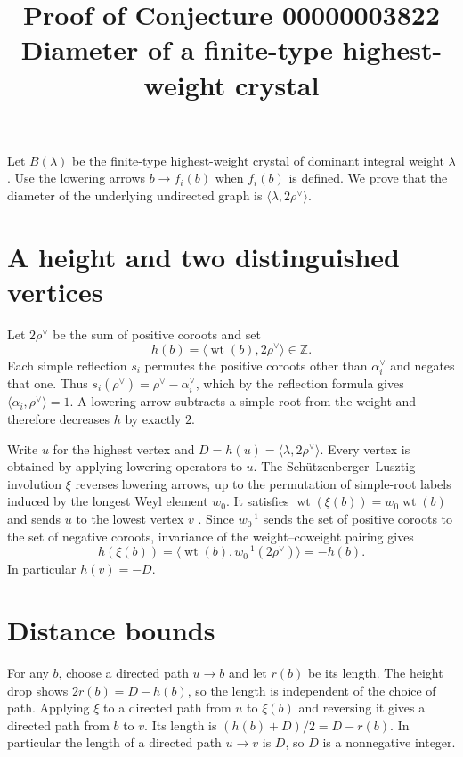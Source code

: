 \documentclass[11pt]{article}
\title{Proof of Conjecture 00000003822\\
\large Diameter of a finite-type highest-weight crystal}
\author{}
\date{}
\begin{document}
\maketitle

Let \(B(\lambda)\) be the finite-type highest-weight crystal of dominant
integral weight \(\lambda\). Use the lowering arrows
\(b\to f_i(b)\) when \(f_i(b)\) is defined. We prove that the diameter
of the underlying undirected graph is \(\langle\lambda,2\rho^\vee\rangle\).

\section*{A height and two distinguished vertices}

Let \(2\rho^\vee\) be the sum of positive coroots and set
\[
   h(b)=\langle\operatorname{wt}(b),2\rho^\vee\rangle\in\mathbb Z .
\]
Each simple reflection \(s_i\) permutes the positive coroots other
than \(\alpha_i^\vee\) and negates that one. Thus
\(s_i(\rho^\vee)=\rho^\vee-\alpha_i^\vee\), which by the reflection
formula gives \(\langle\alpha_i,\rho^\vee\rangle=1\). A lowering arrow
subtracts a simple root from the weight and therefore decreases \(h\)
by exactly \(2\).

Write \(u\) for the highest vertex and \(D=h(u)=
\langle\lambda,2\rho^\vee\rangle\). Every vertex is obtained by
applying lowering operators to \(u\). The Sch\"utzenberger--Lusztig
involution \(\xi\) reverses lowering arrows, up to the permutation
of simple-root labels induced by the longest Weyl element \(w_0\).
It satisfies \(\operatorname{wt}(\xi(b))=w_0\operatorname{wt}(b)\)
and sends \(u\) to the lowest vertex \(v\)
\cite[\S\S 3, 6.1]{azenhas}. Since \(w_0^{-1}\) sends the set of
positive coroots to the set of negative coroots, invariance
of the weight--coweight pairing gives
\[
  h(\xi(b))=\langle\operatorname{wt}(b),w_0^{-1}(2\rho^\vee)\rangle
            =-h(b).
\]
In particular \(h(v)=-D\).

\section*{Distance bounds}

For any \(b\), choose a directed path \(u\to b\) and let \(r(b)\) be
its length. The height drop shows \(2r(b)=D-h(b)\), so the length
is independent of the choice of path. Applying \(\xi\) to a directed
path from \(u\) to \(\xi(b)\) and reversing it gives a directed path
from \(b\) to \(v\). Its length is \((h(b)+D)/2=D-r(b)\).
In particular the length of a directed path \(u\to v\) is \(D\), so
\(D\) is a nonnegative integer.
\end{document}
